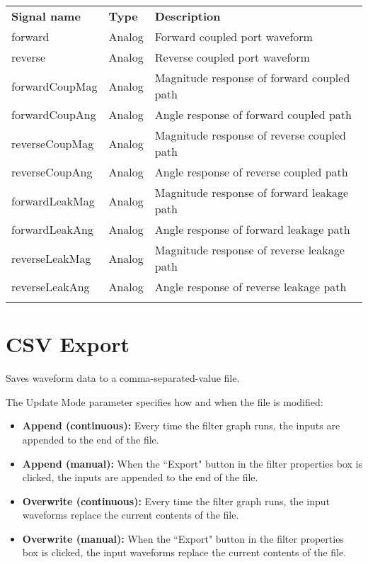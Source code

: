 \begin{tabularx}{16cm}{llX}
\thickhline
\textbf{Signal name} & \textbf{Type} & \textbf{Description} \\
\thickhline
forward & Analog & Forward coupled port waveform \\
\thinhline
reverse & Analog & Reverse coupled port waveform \\
\thinhline
forwardCoupMag & Analog & Magnitude response of forward coupled path \\
\thinhline
forwardCoupAng & Analog & Angle response of forward coupled path \\
\thinhline
reverseCoupMag & Analog & Magnitude response of reverse coupled path \\
\thinhline
reverseCoupAng & Analog & Angle response of reverse coupled path \\
\thinhline
forwardLeakMag & Analog & Magnitude response of forward leakage path \\
\thinhline
forwardLeakAng & Analog & Angle response of forward leakage path \\
\thinhline
reverseLeakMag & Analog & Magnitude response of reverse leakage path \\
\thinhline
reverseLeakAng & Analog & Angle response of reverse leakage path \\
\thickhline
\end{tabularx}


\pagebreak
\section{CSV Export}

Saves waveform data to a comma-separated-value file.

The Update Mode parameter specifies how and when the file is modified:
\begin{itemize}
\item \textbf{Append (continuous):} Every time the filter graph runs, the inputs are appended to the end of the file.
\item \textbf{Append (manual):} When the ``Export" button in the filter properties box is clicked,
the inputs are appended to the end of the file.
\item \textbf{Overwrite (continuous):} Every time the filter graph runs, the input waveforms replace the current contents
of the file.
\item \textbf{Overwrite (manual):} When the ``Export" button in the filter properties box is clicked,
the input waveforms replace the current contents of the file.
\end{itemize}

